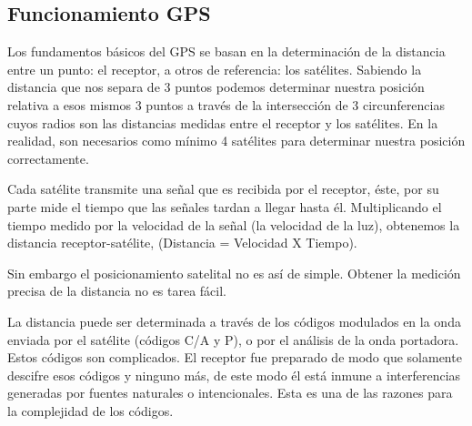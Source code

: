\subsection{Funcionamiento GPS}

Los fundamentos básicos del GPS se basan en la determinación de la distancia entre un punto: el receptor, a otros de referencia: los satélites. Sabiendo la distancia que nos separa de 3 puntos podemos determinar nuestra posición relativa a esos mismos 3 puntos a través de la intersección de 3 circunferencias cuyos radios son las distancias medidas entre el receptor y los satélites. En la realidad, son necesarios como mínimo 4 satélites para determinar nuestra posición correctamente. 

Cada satélite transmite una señal que es recibida por el receptor, éste, por su parte mide el tiempo que las señales tardan a llegar hasta él. Multiplicando el tiempo medido por la velocidad de la señal (la velocidad de la luz), obtenemos la distancia receptor-satélite, (Distancia = Velocidad X Tiempo).

Sin embargo el posicionamiento satelital no es así de simple. Obtener la medición precisa de la distancia no es tarea fácil.

La distancia puede ser determinada a través de los códigos modulados en la onda enviada por el satélite  (códigos C/A y P), o por el análisis de la onda portadora. Estos códigos son complicados. El receptor fue preparado de modo que solamente descifre esos códigos y ninguno más, de este modo él está inmune a interferencias generadas por fuentes naturales o intencionales. Esta es una de las razones para la complejidad de los códigos.  \cite{GPS}